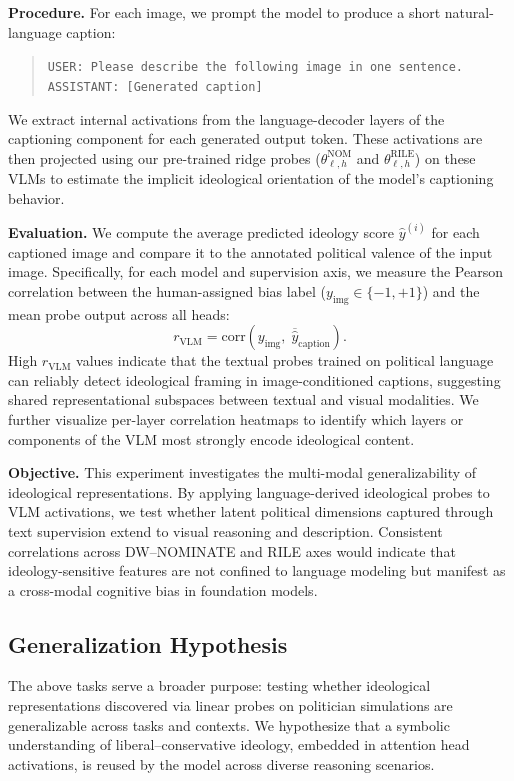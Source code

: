 \documentclass[11pt]{article}
\begin{document}
\textbf{Procedure.} For each image, we prompt the model to produce a short natural-language caption:
\begin{quote}
\texttt{USER: Please describe the following image in one sentence.}\\
\texttt{ASSISTANT: [Generated caption]}
\end{quote}
We extract internal activations from the language-decoder layers of the captioning component for each generated output token. These activations are then projected using our pre-trained ridge probes ($\theta_{\ell,h}^{\text{NOM}}$ and $\theta_{\ell,h}^{\text{RILE}}$) on these VLMs to estimate the implicit ideological orientation of the model’s captioning behavior.

\textbf{Evaluation.} We compute the average predicted ideology score $\hat{y}^{(i)}$ for each captioned image and compare it to the annotated political valence of the input image. Specifically, for each model and supervision axis, we measure the Pearson correlation between the human-assigned bias label ($y_{\text{img}} \in \{-1, +1\}$) and the mean probe output across all heads:
\begin{equation*}
    r_{\text{VLM}} = \mathrm{corr}\!\left(y_{\text{img}}, \; \overline{\hat{y}}_{\text{caption}}\right).
\end{equation*}
High $r_{\text{VLM}}$ values indicate that the textual probes trained on political language can reliably detect ideological framing in image-conditioned captions, suggesting shared representational subspaces between textual and visual modalities. We further visualize per-layer correlation heatmaps to identify which layers or components of the VLM most strongly encode ideological content.

\textbf{Objective.} This experiment investigates the multi-modal generalizability of ideological representations. By applying language-derived ideological probes to VLM activations, we test whether latent political dimensions captured through text supervision extend to visual reasoning and description. Consistent correlations across DW--NOMINATE and RILE axes would indicate that ideology-sensitive features are not confined to language modeling but manifest as a cross-modal cognitive bias in foundation models.

\subsection{Generalization Hypothesis}

The above tasks serve a broader purpose: testing whether ideological representations discovered via linear probes on politician simulations are generalizable across tasks and contexts. We hypothesize that a symbolic understanding of liberal--conservative ideology, embedded in attention head activations, is reused by the model across diverse reasoning scenarios.
\end{document}

